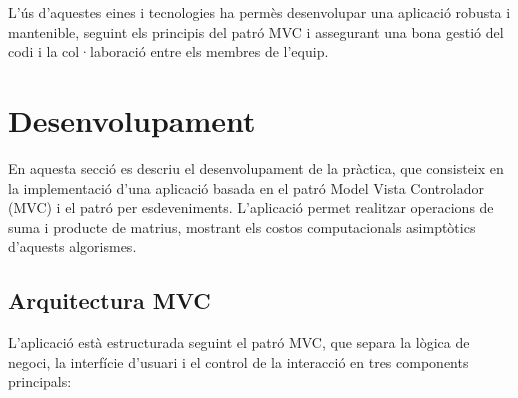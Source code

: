 \documentclass{ieeetj}
\begin{document}
L'ús d'aquestes eines i tecnologies ha permès desenvolupar una aplicació robusta i mantenible, seguint els principis del patró MVC i assegurant una bona gestió del codi i la col·laboració entre els membres de l'equip.

\section{Desenvolupament}
En aquesta secció es descriu el desenvolupament de la pràctica, que consisteix en la implementació d'una aplicació basada en el patró Model Vista Controlador (MVC) i el patró per esdeveniments. L'aplicació permet realitzar operacions de suma i producte de matrius, mostrant els costos computacionals asimptòtics d'aquests algorismes.

\subsection{Arquitectura MVC}
L'aplicació està estructurada seguint el patró MVC, que separa la lògica de negoci, la interfície d'usuari i el control de la interacció en tres components principals:
\end{document}
